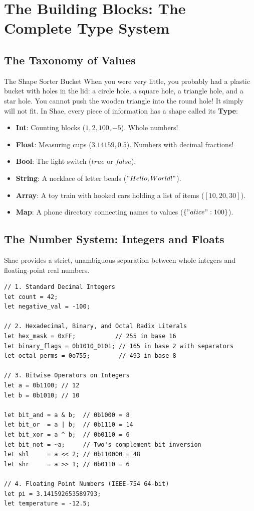 \chapter{The Building Blocks: The Complete Type System}

\section{The Taxonomy of Values}

\begin{kidbox}{The Shape Sorter Bucket}
When you were very little, you probably had a plastic bucket with holes in the lid: a circle hole, a square hole, a triangle hole, and a star hole.
You cannot push the wooden triangle into the round hole! It simply will not fit.
In Shae, every piece of information has a shape called its \textbf{Type}:
\begin{itemize}
    \item \textbf{Int}: Counting blocks ($1, 2, 100, -5$). Whole numbers!
    \item \textbf{Float}: Measuring cups ($3.14159, 0.5$). Numbers with decimal fractions!
    \item \textbf{Bool}: The light switch ($true$ or $false$).
    \item \textbf{String}: A necklace of letter beads ($"Hello, World!"$).
    \item \textbf{Array}: A toy train with hooked cars holding a list of items ($[10, 20, 30]$).
    \item \textbf{Map}: A phone directory connecting names to values ($\{"alice": 100\}$).
\end{itemize}
\end{kidbox}

\section{The Number System: Integers and Floats}

Shae provides a strict, unambiguous separation between whole integers and floating-point real numbers.

\begin{lstlisting}[language=shaelang]
// 1. Standard Decimal Integers
let count = 42;
let negative_val = -100;

// 2. Hexadecimal, Binary, and Octal Radix Literals
let hex_mask = 0xFF;           // 255 in base 16
let binary_flags = 0b1010_0101; // 165 in base 2 with separators
let octal_perms = 0o755;        // 493 in base 8

// 3. Bitwise Operators on Integers
let a = 0b1100; // 12
let b = 0b1010; // 10

let bit_and = a & b;  // 0b1000 = 8
let bit_or  = a | b;  // 0b1110 = 14
let bit_xor = a ^ b;  // 0b0110 = 6
let bit_not = ~a;     // Two's complement bit inversion
let shl     = a << 2; // 0b110000 = 48
let shr     = a >> 1; // 0b0110 = 6

// 4. Floating Point Numbers (IEEE-754 64-bit)
let pi = 3.141592653589793;
let temperature = -12.5;
\end{lstlisting}

